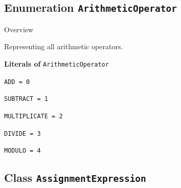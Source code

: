 \subsection{Enumeration \bfseries \texttt{ArithmeticOperator}\normalfont}
\label{cls:uppaal::expressions::ArithmeticOperator} 

	\begin{longdescription}
		\item[Overview] 		
				

	

		Representing all arithmetic operators.		
	
		\item[\textbf{Literals of} \texttt{ArithmeticOperator}] ~
		\begin{longdescription}
			
\item[\texttt{ADD = 0}] ~
\nopagebreak

\item[\texttt{SUBTRACT = 1}] ~
\nopagebreak

\item[\texttt{MULTIPLICATE = 2}] ~
\nopagebreak

\item[\texttt{DIVIDE = 3}] ~
\nopagebreak

\item[\texttt{MODULO = 4}] ~
\nopagebreak
		\end{longdescription}
	\end{longdescription}
	
	

\subsection{Class \bfseries \texttt{AssignmentExpression}\normalfont}
\label{cls:uppaal::expressions::AssignmentExpression} 
	
